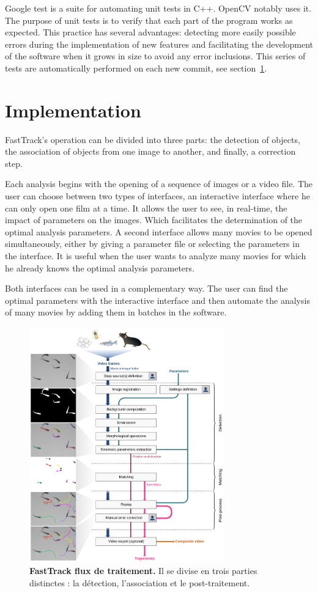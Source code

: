 	Google test is a suite for automating unit tests in C++. OpenCV notably uses it. The purpose of unit tests is to verify that each part of the program works as expected. This practice has several advantages: detecting more easily possible errors during the implementation of new features and facilitating the development of the software when it grows in size to avoid any error inclusions. This series of tests are automatically performed on each new commit, see section~\ref{}.

	\section{Implementation}
	FastTrack's operation can be divided into three parts: the detection of objects, the association of objects from one image to another, and finally, a correction step.

	Each analysis begins with the opening of a sequence of images or a video file. The user can choose between two types of interfaces, an interactive interface where he can only open one film at a time. It allows the user to see, in real-time, the impact of parameters on the images. Which facilitates the determination of the optimal analysis parameters. A second interface allows many movies to be opened simultaneously, either by giving a parameter file or selecting the parameters in the interface. It is useful when the user wants to analyze many movies for which he already knows the optimal analysis parameters.

	Both interfaces can be used in a complementary way. The user can find the optimal parameters with the interactive interface and then automate the analysis of many movies by adding them in batches in the software.


	\begin{figure}[h]
    \centering
    \includegraphics[width=0.75\textwidth]{part_1/assets/Figure_1.png}    
    \caption{\textbf{FastTrack flux de traitement.} Il se divise en trois parties distinctes : la détection, l'association et le post-traitement.}
    \label{part_1:fig_1}
    \end{figure}
	
